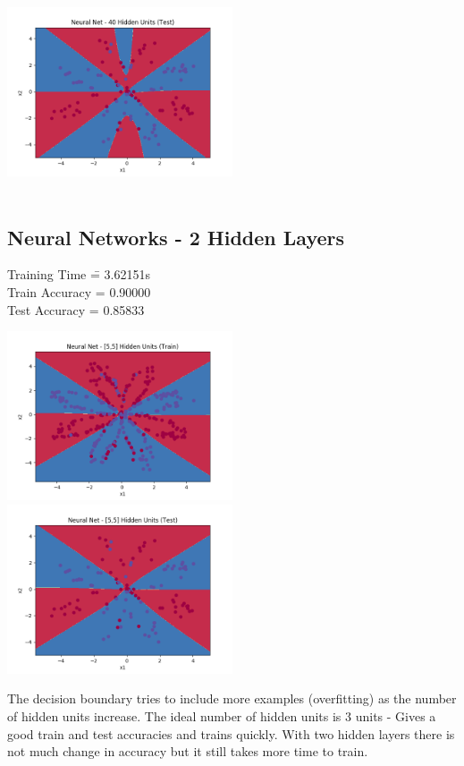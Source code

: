 \documentclass[12pt]{article}
\begin{document}
\begin{addmargin}[0in]{0in}
\includegraphics[width=0.5\textwidth]{nn8.png} \\ \\
\end{addmargin}
\newpage
\subsection*{Neural Networks - 2 Hidden Layers}
\begin{addmargin}[0.3in]{0in}
\begin{tabbing}
Training Time \quad \= = 3.62151s \\
Train Accuracy \> = 0.90000 \\
Test Accuracy \> = 0.85833
\end{tabbing}
\end{addmargin}
\includegraphics[width=0.5\textwidth]{nn9.png}
\includegraphics[width=0.5\textwidth]{nn10.png}
\vspace{5mm}
\begin{addmargin}[0.3in]{0in}
The decision boundary tries to include more examples (overfitting) as the number of hidden units increase. The ideal number of hidden units is 3 units - Gives a good train and test accuracies and trains quickly. With two hidden layers there is not much change in accuracy but it still takes more time to train.
\end{addmargin}
\end{document}
